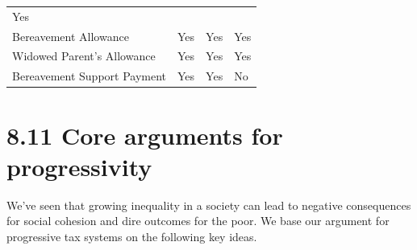 \documentclass[]{tufte-handout}
\begin{document}
\begin{longtable}[]{@{}llll@{}}
\begin{minipage}[t]{0.24\columnwidth}
Yes\strut
\end{minipage}\tabularnewline
\begin{minipage}[t]{0.33\columnwidth}\raggedright
Bereavement Allowance\strut
\end{minipage} & \begin{minipage}[t]{0.15\columnwidth}\raggedright
Yes\strut
\end{minipage} & \begin{minipage}[t]{0.17\columnwidth}\raggedright
Yes\strut
\end{minipage} & \begin{minipage}[t]{0.24\columnwidth}\raggedright
Yes\strut
\end{minipage}\tabularnewline
\begin{minipage}[t]{0.33\columnwidth}\raggedright
Widowed Parent's Allowance\strut
\end{minipage} & \begin{minipage}[t]{0.15\columnwidth}\raggedright
Yes\strut
\end{minipage} & \begin{minipage}[t]{0.17\columnwidth}\raggedright
Yes\strut
\end{minipage} & \begin{minipage}[t]{0.24\columnwidth}\raggedright
Yes\strut
\end{minipage}\tabularnewline
\begin{minipage}[t]{0.33\columnwidth}\raggedright
Bereavement Support Payment\strut
\end{minipage} & \begin{minipage}[t]{0.15\columnwidth}\raggedright
Yes\strut
\end{minipage} & \begin{minipage}[t]{0.17\columnwidth}\raggedright
Yes\strut
\end{minipage} & \begin{minipage}[t]{0.24\columnwidth}\raggedright
No\strut
\end{minipage}\tabularnewline
\bottomrule
\end{longtable}

\hypertarget{core-arguments-for-progressivity}{%
\section{8.11 Core arguments for
progressivity}\label{core-arguments-for-progressivity}}

We've seen that growing inequality in a society can lead to negative
consequences for social cohesion and dire outcomes for the poor. We base
our argument for progressive tax systems on the following key ideas.
\end{document}
